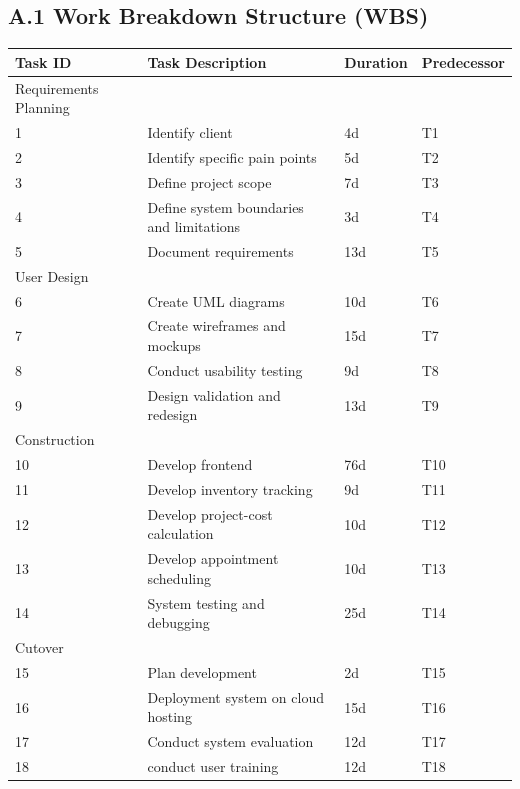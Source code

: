 \documentclass[12pt, letterpaper]{article}
\begin{document}
\subsection*{A.1 Work Breakdown Structure (WBS)}


\begin{table}[h]
\centering

\begin{tabular}{p{2cm} p{6cm} p{2cm} p{2cm}}
\toprule
\textbf{Task ID} & \textbf{Task Description} & \textbf{Duration} & \textbf{Predecessor} \\
\midrule
Requirements Planning& &  &  \\
1 & Identify client & 4d & T1 \\
2 & Identify specific pain points& 5d &T2 \\
3 & Define project scope & 7d & T3 \\
4 & Define system boundaries and limitations & 3d & T4 \\
5 & Document requirements  & 13d & T5 \\
User Design &&& \\
6& Create UML diagrams& 10d & T6 \\
7&Create wireframes and mockups & 15d & T7\\
8&Conduct usability testing & 9d & T8\\
9&Design validation and redesign&13d& T9\\
Construction&&& \\
10 &Develop frontend &76d& T10 \\
11 &Develop inventory tracking &9d & T11 \\
12 &Develop project-cost calculation& 10d & T12 \\
13 &Develop appointment scheduling &10d & T13 \\
14 &System testing and debugging &25d & T14 \\
Cutover &&&\\
15 &Plan development &2d & T15\\
16 &Deployment system on cloud hosting&15d &T16\\
17 &Conduct system evaluation &12d & T17\\
18 &conduct user training &12d &T18 \\

\bottomrule
\end{tabular}
\end{table}
\end{document}
